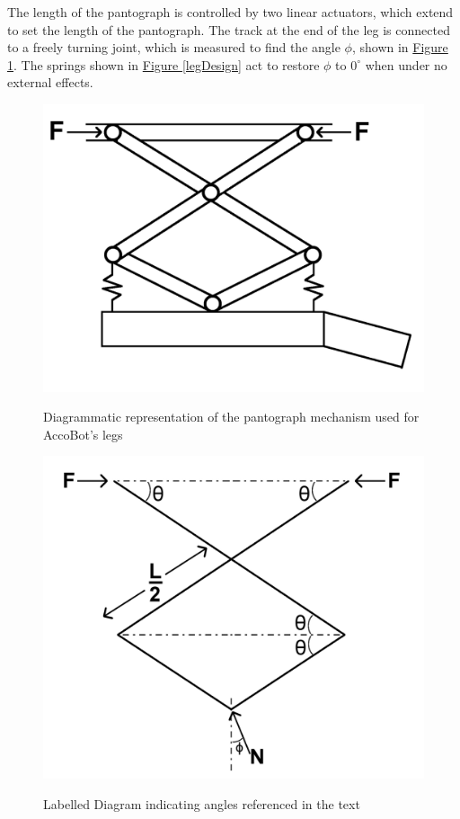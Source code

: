 \documentclass[11pt]{article}		%
\newlength{\imageheight}	 %
\newcommand{\figref}[1]{\hyperref[#1]{Figure \ref*{#1}}}    %
\begin{document}
				The length of the pantograph is controlled by two linear actuators, which extend to set the length of the pantograph.
				The track at the end of the leg is connected to a freely turning joint, which is measured to find the angle $\phi$, shown in \figref{legDiagram}.
				The springs shown in \figref{legDesign} act to restore $\phi$ to $0^\circ$ when under no external effects.
				\begin{figure}[h]
    				\centering
    				\begin{multicols}{2}
    					\includegraphics[height=\imageheight]{legDesign}
    					\caption{Diagrammatic representation of the pantograph mechanism used for AccoBot's legs}
    					\label{legDesign}
    					\columnbreak
    					\includegraphics[height=\imageheight]{legDiagram}
    					\caption{Labelled Diagram indicating angles referenced in the text}
    					\label{legDiagram}
    				\end{multicols}
    			\end{figure}
\end{document}
